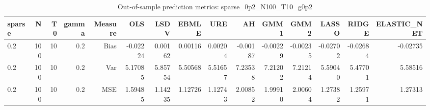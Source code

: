 \begin{table}[!htbp]\centering
\caption{Out-of-sample prediction metrics: sparse_0p2_N100_T10_g0p2}
\label{tab:table3_sparse_0p2_N100_T10_g0p2}
\begin{tabular}{lrrrrrrrrrrrrrr}
\hline
sparse & N & T0 & gamma & Measure & OLS & LSDV & EBMLE & URE & AH & GMM1 & GMM2 & LASSO & RIDGE & ELASTIC_NET \\
\hline
0.2 & 100 & 10 & 0.2 & Bias & -0.02224 & 0.00162 & 0.00116 & 0.00204 & -0.00187 & -0.00229 & -0.00235 & -0.02702 & -0.02684 & -0.02735 \\
0.2 & 100 & 10 & 0.2 & Var & 5.17085 & 5.85754 & 5.50568 & 5.51657 & 7.23538 & 7.21202 & 7.21214 & 5.59040 & 5.47701 & 5.58516 \\
0.2 & 100 & 10 & 0.2 & MSE & 1.59485 & 1.14235 & 1.12726 & 1.12743 & 2.00852 & 1.99910 & 2.00604 & 1.27382 & 1.25971 & 1.27313 \\
\hline
\end{tabular}
\end{table}

